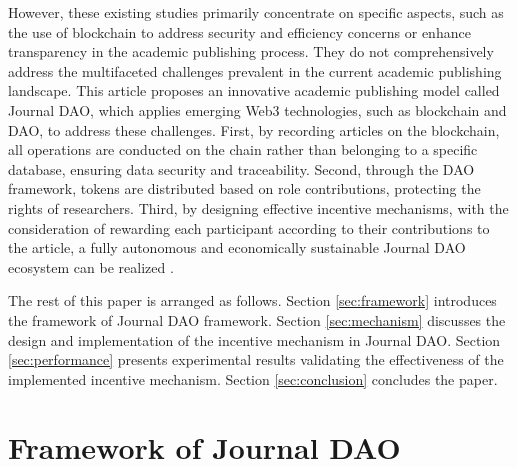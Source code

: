 \documentclass[lettersize,journal]{IEEEtran}
\begin{document}
However, these existing studies primarily concentrate on specific aspects, such as the use of blockchain to address security and efficiency concerns or enhance transparency in the academic publishing process. They do not comprehensively address the multifaceted challenges prevalent in the current academic publishing landscape. This article proposes an innovative academic publishing model called Journal DAO, which applies emerging Web3 technologies, such as blockchain and DAO, to address these challenges. First, by recording articles on the blockchain, all operations are conducted on the chain rather than belonging to a specific database, ensuring data security and traceability. Second, through the DAO framework, tokens are distributed based on role contributions, protecting the rights of researchers. Third, by designing effective incentive mechanisms, with the consideration of rewarding each participant according to their contributions to the article, a fully autonomous and economically sustainable Journal DAO ecosystem can be realized \cite{ding2022desci}.

The rest of this paper is arranged as follows. Section \ref{sec:framework} introduces the framework of Journal DAO framework. Section \ref{sec:mechanism} discusses the design and implementation of the incentive mechanism in Journal DAO. Section \ref{sec:performance} presents experimental results validating the effectiveness of the implemented incentive mechanism.
Section \ref{sec:conclusion} concludes the paper.


\section{Framework of Journal DAO \label{sec:framework}}
\end{document}
